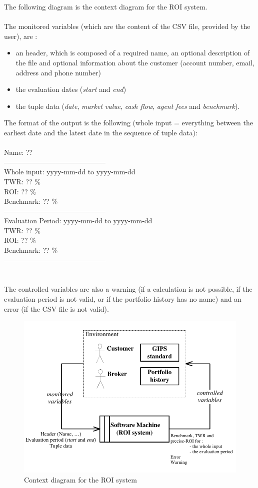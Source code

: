 \documentclass[runningheads,12pt]{article}
\begin{document}
The following diagram is the context diagram for the ROI system.\\
\\
The monitored variables (which are the content of the CSV file, provided by the user), are :
\begin{itemize}
\item an header, which is composed of a required name, an optional description of the file and optional information about the customer (account number, email, address and phone number)
\item the evaluation dates (\textit{start} and \textit{end})
\item the tuple data (\textit{date}, \textit{market value}, \textit{cash flow}, \textit{agent fees} and \textit{benchmark}).
\end{itemize}
\bigskip
The format of the output is the following (whole input = everything between the earliest date and the latest date in the sequence of tuple data):\\
\\
Name: ??\\
--------------------------------------------\\
Whole input: yyyy-mm-dd to yyyy-mm-dd\\
TWR: ?? \%\\
ROI: ?? \%\\
Benchmark: ?? \%\\
--------------------------------------------\\
Evaluation Period: yyyy-mm-dd to yyyy-mm-dd\\
TWR: ?? \%\\
ROI: ?? \%\\
Benchmark: ?? \%\\
--------------------------------------------\\
\\
\\
The controlled variables are also a warning (if a calculation is not possible, if the evaluation period is not valid, or if the portfolio history has no name) and an error (if the CSV file is not valid).\\

\begin{figure}
\centering
\includegraphics[scale=1.0]{inputs/context.pdf}
\caption{Context diagram for the ROI system}
\label{fig:ROI-context}
\end{figure}
\end{document}
